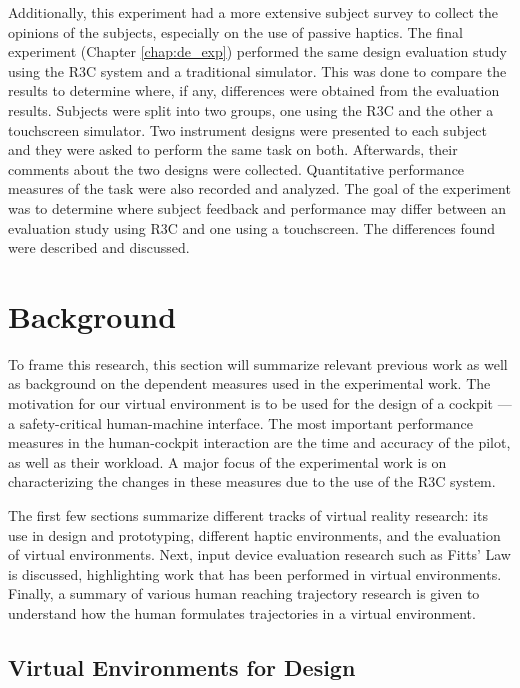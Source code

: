Additionally, this experiment had a more extensive subject survey to collect the opinions of the subjects, especially on the use of passive haptics.
The final experiment (Chapter \ref{chap:de_exp}) performed the same design evaluation study using the R3C system and a traditional simulator.
This was done to compare the results to determine where, if any, differences were obtained from the evaluation results.
Subjects were split into two groups, one using the R3C and the other a touchscreen simulator.
Two instrument designs were presented to each subject and they were asked to perform the same task on both.
Afterwards, their comments about the two designs were collected.
Quantitative performance measures of the task were also recorded and analyzed.
The goal of the experiment was to determine where subject feedback and performance may differ between an evaluation study using R3C and one using a touchscreen.
The differences found were described and discussed.

\section{Background}
\label{sec:intro_background}

To frame this research, this section will summarize relevant previous work as well as background on the dependent measures used in the experimental work.
The motivation for our virtual environment is to be used for the design of a cockpit --- a safety-critical human-machine interface.
The most important performance measures in the human-cockpit interaction are the time and accuracy of the pilot, as well as their workload.
A major focus of the experimental work is on characterizing the changes in these measures due to the use of the R3C system.

The first few sections summarize different tracks of virtual reality research: its use in design and prototyping, different haptic environments, and the evaluation of virtual environments.
Next, input device evaluation research such as Fitts' Law is discussed, highlighting work that has been performed in virtual environments.
Finally, a summary of various human reaching trajectory research is given to understand how the human formulates trajectories in a virtual environment.



\subsection{Virtual Environments for Design}

